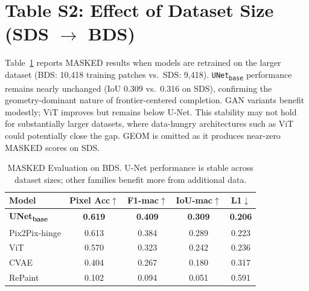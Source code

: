 \documentclass[12pt,a4paper]{article}
\begin{document}
\clearpage

\section*{Table S2: Effect of Dataset Size (SDS $\rightarrow$ BDS)}

Table~\ref{tab:masked_bds} reports MASKED results when models are
retrained on the larger dataset (BDS: 10,418 training patches vs.\
SDS: 9,418). \texttt{UNet\textsubscript{base}} performance remains
nearly unchanged (IoU 0.309 vs.\ 0.316 on SDS), confirming the
geometry-dominant nature of frontier-centered completion. GAN variants
benefit modestly; ViT improves but remains below U-Net. This
stability may not hold for substantially larger datasets, where
data-hungry architectures such as ViT could potentially close the gap.
GEOM is omitted as it produces near-zero MASKED scores on SDS.

\begin{table}[!ht]
\renewcommand{\arraystretch}{1.3}
\caption{MASKED Evaluation on BDS. U-Net performance is stable
across dataset sizes; other families benefit more from additional data.}
\label{tab:masked_bds}
\centering
\setlength{\tabcolsep}{6pt}
\begin{tabular}{lcccc}
\toprule
\textbf{Model} & \textbf{Pixel Acc}$\uparrow$
    & \textbf{F1-mac}$\uparrow$
    & \textbf{IoU-mac}$\uparrow$
    & \textbf{L1}$\downarrow$ \\
\midrule
\textbf{UNet\textsubscript{base}} & \textbf{0.619} & \textbf{0.409} & \textbf{0.309} & \textbf{0.206} \\
Pix2Pix-hinge                     & 0.613 & 0.384 & 0.289 & 0.223 \\
ViT                               & 0.570 & 0.323 & 0.242 & 0.236 \\
CVAE                              & 0.404 & 0.267 & 0.180 & 0.317 \\
RePaint                           & 0.102 & 0.094 & 0.051 & 0.591 \\
\bottomrule
\end{tabular}
\end{table}
\end{document}
